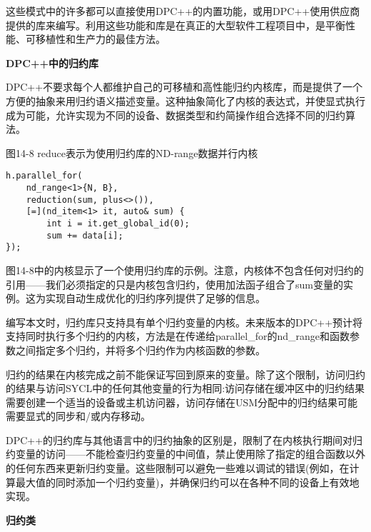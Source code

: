 这些模式中的许多都可以直接使用DPC++的内置功能，或用DPC++使用供应商提供的库来编写。利用这些功能和库是在真正的大型软件工程项目中，是平衡性能、可移植性和生产力的最佳方法。\par

\hspace*{\fill} \par %
\textbf{DPC++中的归约库}

DPC++不要求每个人都维护自己的可移植和高性能归约内核库，而是提供了一个方便的抽象来用归约语义描述变量。这种抽象简化了内核的表达式，并使显式执行成为可能，允许实现为不同的设备、数据类型和约简操作组合选择不同的归约算法。\par

\hspace*{\fill} \par %
图14-8 reduce表示为使用归约库的ND-range数据并行内核
\begin{lstlisting}[caption={}]
h.parallel_for(
	nd_range<1>{N, B},
	reduction(sum, plus<>()),
	[=](nd_item<1> it, auto& sum) {
		int i = it.get_global_id(0);
		sum += data[i];
});
\end{lstlisting}

图14-8中的内核显示了一个使用归约库的示例。注意，内核体不包含任何对归约的引用——我们必须指定的只是内核包含归约，使用加法函子组合了sum变量的实例。这为实现自动生成优化的归约序列提供了足够的信息。\par

编写本文时，归约库只支持具有单个归约变量的内核。未来版本的DPC++预计将支持同时执行多个归约的内核，方法是在传递给parallel\_for的nd\_range和函数参数之间指定多个归约，并将多个归约作为内核函数的参数。\par

归约的结果在内核完成之前不能保证写回到原来的变量。除了这个限制，访问归约的结果与访问SYCL中的任何其他变量的行为相同:访问存储在缓冲区中的归约结果需要创建一个适当的设备或主机访问器，访问存储在USM分配中的归约结果可能需要显式的同步和/或内存移动。\par

DPC++的归约库与其他语言中的归约抽象的区别是，限制了在内核执行期间对归约变量的访问——不能检查归约变量的中间值，禁止使用除了指定的组合函数以外的任何东西来更新归约变量。这些限制可以避免一些难以调试的错误(例如，在计算最大值的同时添加一个归约变量)，并确保归约可以在各种不同的设备上有效地实现。\par

\hspace*{\fill} \par %
\textbf{归约类}

